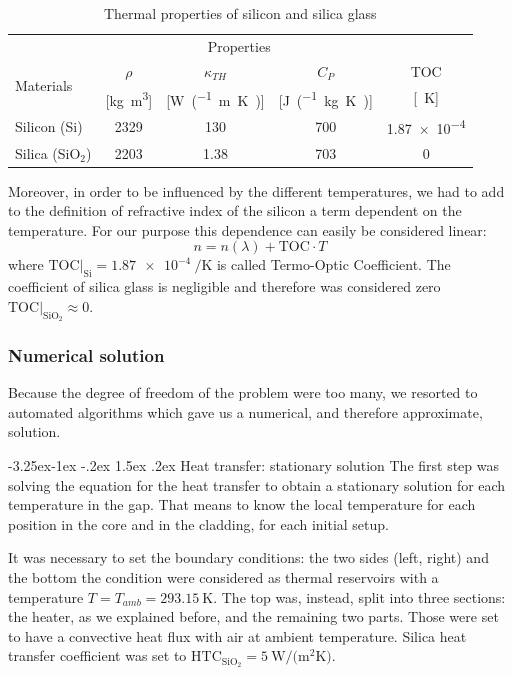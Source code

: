 \documentclass[12pt,a4paper,twoside]{article}
\makeatletter
\renewcommand\paragraph{
   \@startsection{paragraph}{4}{\z@}%
   {-3.25ex\@plus -1ex \@minus -.2ex}%
   {1.5ex \@plus .2ex}%
   {\normalfont\normalsize\bfseries}}
\makeatother
\begin{document}
\begin{table}[ht]
\centering
  \begin{tabular}{lcccc}  
    \toprule
		& \multicolumn{3}{c}{Properties} \\
    \cmidrule(r){2-5}
    	\multirow{2}{*}{Materials}    & $\rho$ & $\kappa_{TH}$ & $C_P$ & TOC\\
  		& [\si{\kg\m^3}] & [\si{\W\per(\m\K)}] & [\si{\J\per(\kg\K)}] & [\si{\per\K}] \\
    \midrule
    Silicon (Si)			& 2329	& 130	& 700	& \num{1.87e-4}\\
    Silica (SiO$_2$)		& 2203	& 1.38	& 703	& 0\\
    \bottomrule
  \end{tabular}
  \label{tab_materials}
  \caption{Thermal properties of silicon and silica glass}
\end{table}

Moreover, in order to be influenced by the different temperatures, we had to add to the definition of refractive index of the silicon a term dependent on the temperature.
For our purpose this dependence can easily be considered linear:
\begin{equation}
n = n(\lambda)+\mathrm{TOC}\cdot T
\end{equation}
where $\mathrm{TOC}|_{\mathrm{Si}} = \SI{1.87e-4}{\per\K}$\cite{n_db} is called Termo-Optic Coefficient. The coefficient of silica glass is negligible and therefore was considered zero $\mathrm{TOC}|_{\mathrm{SiO}_2} \approx 0$.

\subsubsection{Numerical solution}
Because the degree of freedom of the problem were too many, we resorted to automated algorithms which gave us a numerical, and therefore approximate, solution.

\paragraph{Heat transfer: stationary solution}
The first step was solving the equation for the heat transfer to obtain a stationary solution for each temperature in the gap.
That means to know the local temperature for each position in the core and in the cladding, for each initial setup.

It was necessary to set the boundary conditions: the two sides (left, right) and the bottom the condition were considered as thermal reservoirs with a temperature $T = T_{amb} = \SI{293.15}{\K}$.
The top was, instead, split into three sections: the heater, as we explained before, and the remaining two parts.
Those were set to have a convective heat flux with air at ambient temperature.
Silica heat transfer coefficient was set to $\mathrm{HTC}_{\mathrm{SiO}_2} = \SI{5}{\W\per(\m^2\K)}$.
\end{document}

